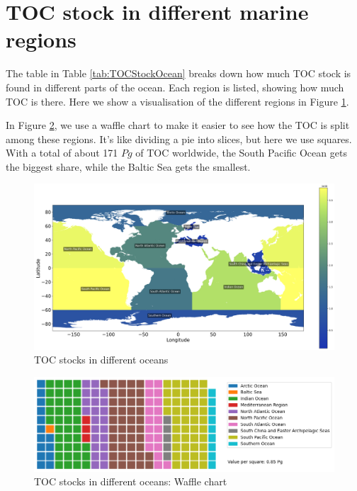 \documentclass[journal abbreviation, manuscript]{copernicus}
\begin{document}
\newpage
\section{TOC stock in different marine regions}
The table in Table \ref{tab:TOCStockOcean} breaks down how much TOC stock is found in different parts of the ocean. Each region is listed, showing how much TOC is there. Here we show a visualisation of the different regions in Figure \ref{fig:TOCStockOceans}.

In Figure \ref{fig:TOCStockOceansWaffle}, we use a waffle chart to make it easier to see how the TOC is split among these regions. It's like dividing a pie into slices, but here we use squares. With a total of about 171 $Pg$ of TOC worldwide, the South Pacific Ocean gets the biggest share, while the Baltic Sea gets the smallest.
\begin{figure}[!htb]   
\centering
   \includegraphics[width = 12cm]{figures/f10.png}
   \caption{TOC stocks in different oceans}
   \label{fig:TOCStockOceans}
\end{figure}

\begin{figure}[!htb]
   \centering
   \includegraphics[width = 12cm]{figures/f11.png}
   \caption{TOC stocks in different oceans: Waffle chart}
   \label{fig:TOCStockOceansWaffle}
\end{figure}


\newpage
{} 
\end{document}
